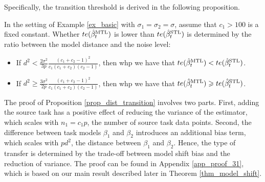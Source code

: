 Specifically, the transition threshold is derived in the following proposition.
\begin{proposition}\label{prop_dist_transition}
	In the setting of Example \ref{ex_basic} with $\sigma_1 = \sigma_2 = \sigma$, assume that $c_1 > 100$ is a fixed constant.
	Whether $te(\hat{\beta}_t^{\text{MTL}})$ is lower than $te(\hat{\beta}_t^{\text{STL}})$ is determined by the ratio between the model distance and the noise level:
	\begin{itemize}
		\item If ${d^2} < \frac {2\sigma^2} {3p} \frac{(c_1 + c_2 -1)^2}{c_1 (c_1 + c_2)(c_2 - 1)}$, then whp we have that $te(\hat{\beta}_t^{\text{MTL}}) < te(\hat{\beta}_t^{\text{STL}})$.
		\item If ${d^2} \ge \frac {3\sigma^2} {2p} \frac{(c_1 + c_2 -1)^2}{c_1(c_1 + c_2)(c_2 - 1)} $, then whp we have that $te(\hat{\beta}_t^{\text{MTL}}) \geqslant te(\hat{\beta}_t^{\text{STL}})$.
	\end{itemize}
\end{proposition}

The proof of Proposition \ref{prop_dist_transition} involves two parts.
First, adding the source task has a positive effect of reducing the variance of the estimator, which scales with $n_1 = c_1 p$, the number of source task data points.
Second, the difference between task models $\beta_1$ and $\beta_2$ introduces an additional bias term, which scales with $pd^2$, the distance between $\beta_1$ and $\beta_2$.
Hence, the type of transfer is determined by the trade-off between model shift bias and the reduction of variance.
The proof can be found in Appendix \ref{app_proof_31}, which is based on our main result described later in Theorem \ref{thm_model_shift}.

